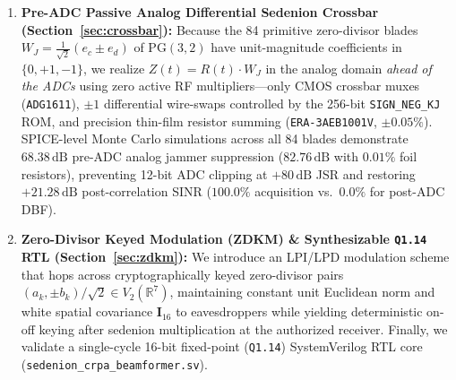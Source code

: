 \documentclass[journal,twoside]{IEEEtran}
\theoremstyle{definition}
\theoremstyle{remark}
\newcommand{\R}{\mathbb{R}}
\newcommand{\PG}{\mathrm{PG}}
\begin{document}
\begin{enumerate}
    \item \textbf{Pre-ADC Passive Analog Differential Sedenion Crossbar (Section~\ref{sec:crossbar}):} Because the 84 primitive zero-divisor blades $W_J = \frac{1}{\sqrt{2}}(e_c \pm e_d)$ of $\PG(3,2)$ have unit-magnitude coefficients in $\{0, +1, -1\}$, we realize $Z(t) = R(t)\cdot W_J$ in the analog domain \emph{ahead of the ADCs} using zero active RF multipliers—only CMOS crossbar muxes (\texttt{ADG1611}), $\pm 1$ differential wire-swaps controlled by the 256-bit \texttt{SIGN\_NEG\_KJ} ROM, and precision thin-film resistor summing (\texttt{ERA-3AEB1001V}, $\pm 0.05\%$). SPICE-level Monte Carlo simulations across all 84 blades demonstrate $68.38\,\mathrm{dB}$ pre-ADC analog jammer suppression ($82.76\,\mathrm{dB}$ with $0.01\%$ foil resistors), preventing 12-bit ADC clipping at $+80\,\mathrm{dB}$ JSR and restoring $+21.28\,\mathrm{dB}$ post-correlation SINR ($100.0\%$ acquisition vs.\ $0.0\%$ for post-ADC DBF).
    \item \textbf{Zero-Divisor Keyed Modulation (ZDKM) \& Synthesizable \texttt{Q1.14} RTL (Section~\ref{sec:zdkm}):} We introduce an LPI/LPD modulation scheme that hops across cryptographically keyed zero-divisor pairs $(a_k, \pm b_k)/\sqrt{2} \in V_2(\R^7)$, maintaining constant unit Euclidean norm and white spatial covariance $\bm{I}_{16}$ to eavesdroppers while yielding deterministic on-off keying after sedenion multiplication at the authorized receiver. Finally, we validate a single-cycle 16-bit fixed-point (\texttt{Q1.14}) SystemVerilog RTL core (\texttt{sedenion\_crpa\_beamformer.sv}).
\end{enumerate}

\end{document}
